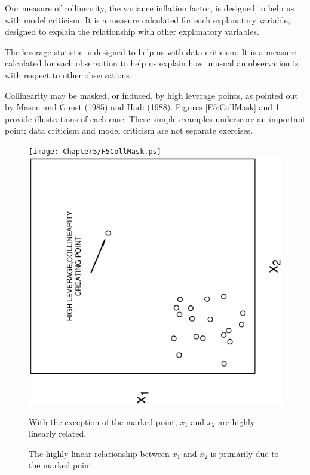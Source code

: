 Our measure of collinearity, the variance inflation factor, is designed to
help us with model criticism. It is a measure calculated for each
explanatory variable, designed to explain the relationship with other
explanatory variables.

The leverage statistic is designed to help us with data criticism. It is a
measure calculated for each observation to help us explain how unusual an
observation is with respect to other observations.

Collinearity may be masked, or induced, by high leverage points, as
pointed out by Mason and Gunst (1985) and Hadi (1988). Figures
\ref{F5:CollMask} and \ref{F5:CollInduce} provide illustrations of
each case. These simple examples underscore an important point; data
criticism and model criticism are not separate exercises.


\begin{figure}[htp]
    \texttt{[image: Chapter5/F5CollMask.ps]}
    $~~~~~~$
    \includegraphics[width=1\textwidth,angle=270,scale=0.45]{Chapter5/F5CollInduce.ps}    \hfill
      \parbox[t]{2.5in}{\caption{\label{F5:CollMask} \small  With the exception of
the marked point, $x_1$ and $x_2$ are highly linearly related.}}
\hfill
        \parbox[t]{2.5in}{ \caption{\label{F5:CollInduce} \small  The highly linear relationship
between $x_1$ and $x_2$ is primarily due to the marked point.}}
\end{figure}


